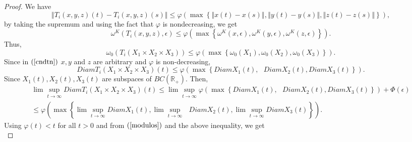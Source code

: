 \documentclass{amsart}
\theoremstyle{plain}
\numberwithin{equation}{section}
\begin{document}
\begin{proof}
We have\begin{equation*}
\left\Vert T_{i}\left( x,y,z\right) \left( t\right) -T_{i}\left(
x,y,z\right) \left( s\right) \right\Vert \leqslant \varphi \left( \max
\left\{ \left\Vert x\left( t\right) -x\left( s\right) \right\Vert
,\left\Vert y\left( t\right) -y\left( s\right) \right\Vert ,\left\Vert
z\left( t\right) -z\left( s\right) \right\Vert \right\} \right) ,
\end{equation*}by taking the supremum and using the fact that $\varphi $ is nondecreasing,
we get\begin{equation*}
\omega ^{K}\left( T_{i}\left( x,y,z\right) ,\epsilon \right) \leqslant
\varphi \left( \max \left\{ \omega ^{K}\left( x,\epsilon \right) ,\omega
^{K}\left( y,\epsilon \right) ,\omega ^{K}\left( z,\epsilon \right) \right\}
\right) .
\end{equation*}Thus,\begin{equation}
\omega _{0}\left( T_{i}\left( X_{1}\times X_{2}\times X_{3}\right) \right)
\leqslant \varphi \left( \max \left\{ \omega _{0}\left( X_{1}\right) ,\omega
_{0}\left( X_{2}\right) ,\omega _{0}\left( X_{3}\right) \right\} \right) .
\label{modulos}
\end{equation}Since in $\left( \text{\ref{cndtn}}\right) $ $x,y$ and $z$ are arbitrary and 
$\varphi $ is non-decreasing,\begin{equation*}
DiamT_{i}\left( X_{1}\times X_{2}\times X_{3}\right) \left( t\right)
\leqslant \varphi \left( \max \left\{ DiamX_{1}\left( t\right) ,\text{ }DiamX_{2}\left( t\right) ,DiamX_{3}\left( t\right) \right\} \right) .
\end{equation*}Since $X_{1}\left( t\right) ,X_{2}\left( t\right) ,X_{3}\left( t\right) $
are subspaces of $BC\left( \mathbb{R}_{+}\right) $. Then,\begin{multline*}
\lim \sup_{t\rightarrow \infty }DiamT_{i}\left( X_{1}\times X_{2}\times
X_{3}\right) \left( t\right) \leqslant \lim \sup_{t\rightarrow \infty
}\varphi \left( \max \left\{ DiamX_{1}\left( t\right) ,\text{ }DiamX_{2}\left( t\right) ,DiamX_{3}\left( t\right) \right\} \right) +\Phi
\left( \epsilon \right) \\
\leqslant \varphi \left( \max \left\{ \lim \sup_{t\rightarrow \infty
}DiamX_{1}\left( t\right) ,\lim \sup_{t\rightarrow \infty }\text{ }DiamX_{2}\left( t\right) ,\lim \sup_{t\rightarrow \infty }DiamX_{3}\left(
t\right) \right\} \right) .
\end{multline*}Using $\varphi \left( t\right) <t$ for all $t>0$ and from $\left( \text{\ref{modulos}}\right) $ and the above inequality, we get\begin{equation*}

\end{equation*}
\end{proof}
\end{document}
